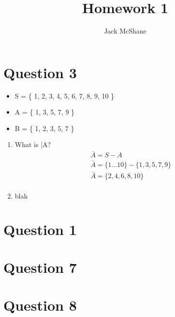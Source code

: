 \documentclass[letterpaper,12pt]{article}
\begin{document}
\title{Homework 1}
\author{Jack McShane}
\maketitle


\section{Question 3}
\begin{itemize}
    \item{S = \{ 1, 2, 3, 4, 5, 6, 7, 8, 9, 10 \}}
    \item{A = \{ 1, 3, 5, 7, 9 \}}
    \item{B = \{ 1, 2, 3, 5, 7 \}}
\end{itemize}

\begin{enumerate}[label= (\alph*)]
    \item{What is \bar{A}?}
        \begin{align*}
            \bar{A} = S - A \\
            \bar{A} = \{1\dots10\} - \{1, 3, 5, 7, 9\} \\
            \bar{A} = \{2, 4, 6, 8, 10\} \\
        \end{align*}
    \item{blah}
\end{enumerate}


\section{Question 1}

\section{Question 7}
\section{Question 8}
\end{document}
